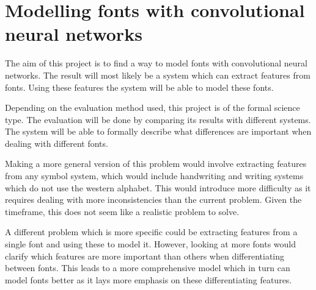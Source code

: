 \documentclass[11pt]{article}
\begin{document}
\section{Modelling fonts with convolutional neural networks}

The aim of this project is to find a way to model fonts with convolutional neural networks. The result will most likely be a system which can extract features from fonts. Using these features the system will be able to model these fonts.

Depending on the evaluation method used, this project is of the formal science type. The evaluation will be done by comparing its results with different systems. The system will be able to formally describe what differences are important when dealing with different fonts.

Making a more general version of this problem would involve extracting features from any symbol system, which would include handwriting and writing systems which do not use the western alphabet. This would introduce more difficulty as it requires dealing with more inconsistencies than the current problem. Given the timeframe, this does not seem like a realistic problem to solve.

A different problem which is more specific could be extracting features from a single font and using these to model it. However, looking at more fonts would clarify which features are more important than others when differentiating between fonts. This leads to a more comprehensive model which in turn can model fonts better as it lays more emphasis on these differentiating features. 
\end{document}
